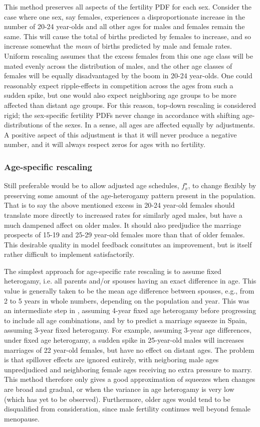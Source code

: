 \documentclass[reqno,12pt,oneside,a4paper]{report} %
\theoremstyle{plain}
\theoremstyle{definition}
\theoremstyle{remark}
\numberwithin{theorem}{chapter}     %
\begin{document}
This method preserves all aspects of the fertility PDF for each sex. Consider the case where one sex, say females, experiences a disproportionate increase in the number of 20-24 year-olds and all other ages for males and females remain the same. This will cause the total of births predicted by females to increase, and so increase somewhat the \textit{mean} of births predicted by male and female rates. Uniform rescaling assumes that the excess females from this one age class will be mated evenly across the distribution of males, and the other age classes of females will be equally disadvantaged by the boom in 20-24 year-olds. One could reasonably expect ripple-effects in competition across the ages from such a sudden spike, but one would also expect neighboring age groups to be more affected than distant age groups. For this reason, top-down rescaling is considered rigid; the sex-specific fertility PDFs never change in accordance with shifting age-distributions of the sexes. In a sense, all ages are affected equally by adjustments. A positive aspect of this adjustment is that it will never produce a negative number, and it will always respect zeros for ages with no fertility.

\subsubsection{Age-specific rescaling}
Still preferable would be to allow adjusted age schedules, $f_x^{\star}$, to change flexibly by preserving some amount of the age-heterogamy pattern present in the population. That is to say the above mentioned excess in 20-24 year-old females should translate more directly to increased rates for similarly aged males, but have a much dampened affect on older males. It should also predjudice the marriage prospects of 15-19 and 25-29 year-old females more than that of older females. This desirable quality in model feedback consitutes an improvement, but is itself rather difficult to implement satisfactorily. 

The simplest approach for age-specific rate rescaling is to assume fixed heterogamy, i.e. all parents and/or spouses having an exact difference in age. This value is generally taken to be the mean age difference between spouses, e.g., from 2 to 5 years in whole numbers, depending on the population and year. This was an intermediate step in \citet{karmel1947relations}, assuming 4-year fixed age heterogamy before progressing to include all age combinations, and by \citet{cabre1997tortulos} to predict a marriage squeeze in Spain, assuming 3-year fixed heterogamy. For example, assuming 3-year age differences, under fixed age heterogamy, a sudden spike in 25-year-old males will increases marriages of 22 year-old females, but have no effect on distant ages. The problem is that spillover effects are ignored entirely, with neigboring male ages unpredjudiced and neighboring female ages receiving no extra pressure to marry. This method therefore only gives a good approximation of squeezes when changes are broad and gradual, or when the variance in age heterogamy is very low (which has yet to be observed). Furthermore, older ages would tend to be disqualified from consideration, since male fertility continues well beyond female menopause.
\end{document}
